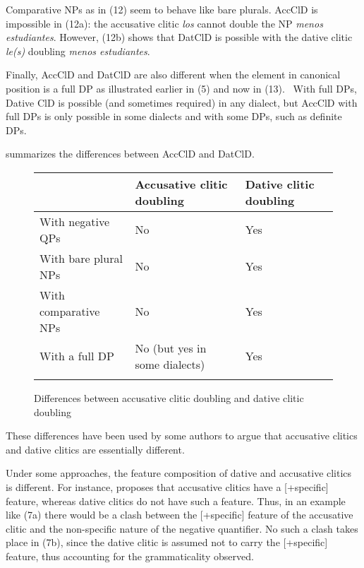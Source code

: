 \documentclass[output=paper,colorlinks,citecolor=brown,
]{langscibook}
\begin{document}
Comparative NPs as in (12) seem to behave like bare plurals. AccClD is impossible in (12a): the accusative clitic \textit{los} cannot double the NP \textit{menos estudiantes}. However, (12b) shows that DatClD is possible with the dative clitic \textit{le(s)} doubling \textit{menos estudiantes}.




Finally, AccClD and DatClD are also different when the element in canonical position is a full DP as illustrated earlier in (5) and now in (13). \ With full DPs, Dative ClD is possible (and sometimes required) in any dialect, but AccClD with full DPs is only possible in some dialects and with some DPs, such as definite DPs.




 summarizes the differences between AccClD and DatClD.

\begin{figure}
\begin{tabular}{lll}
\lsptoprule
                        & Accusative clitic doubling    & Dative clitic doubling    \\\midrule
With negative QPs       & No                            & Yes                       \\\midrule
With bare plural NPs    & No                            & Yes                       \\\midrule
With comparative NPs    & No                            & Yes                       \\\midrule
With a full DP          & No (but yes in some dialects) & Yes                       \\
\lspbottomrule
\end{tabular}
\caption{Differences between accusative clitic doubling and dative clitic doubling}
\label{tab:ausin:1}
\end{figure}

These differences have been used by some authors to argue that accusative clitics and dative clitics are essentially different.

Under some approaches, the feature composition of dative and accusative clitics is different. For instance, \citet{suñer1988} proposes that accusative clitics have a [+specific] feature, whereas dative clitics do not have such a feature. Thus, in an example like (7a) there would be a clash between the [+specific] feature of the accusative clitic and the non-specific nature of the negative quantifier. No such a clash takes place in (7b), since the dative clitic is assumed not to carry the [+specific] feature, thus accounting for the grammaticality observed.
\end{document}
